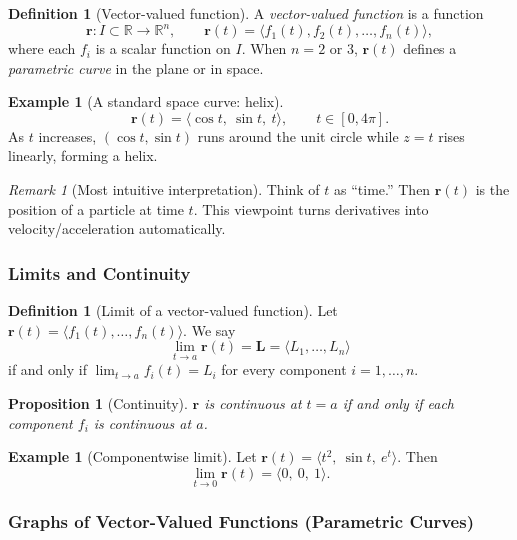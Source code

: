 \documentclass[12pt]{article}
\numberwithin{equation}{section}
\newcommand{\RR}{\mathbb{R}}
\newcommand{\vect}[1]{\boldsymbol{#1}}   %
\theoremstyle{plain}
\newtheorem{proposition}[theorem]{Proposition}
\theoremstyle{definition}
\newtheorem{definition}[theorem]{Definition}
\newtheorem{example}[theorem]{Example}
\theoremstyle{remark}
\newtheorem{remark}[theorem]{Remark}
\begin{document}
\begin{definition}[Vector-valued function]
A \emph{vector-valued function} is a function
\[
\vect r:I\subset\RR \to \RR^n,\qquad
\vect r(t)=\langle f_1(t),f_2(t),\dots,f_n(t)\rangle,
\]
where each $f_i$ is a scalar function on $I$.
When $n=2$ or $3$, $\vect r(t)$ defines a \emph{parametric curve} in the plane or in space.
\end{definition}

\begin{example}[A standard space curve: helix]
\[
\vect r(t)=\langle \cos t,\ \sin t,\ t\rangle,\qquad t\in[0,4\pi].
\]
As $t$ increases, $(\cos t,\sin t)$ runs around the unit circle while $z=t$ rises linearly, forming a helix.
\end{example}

\begin{remark}[Most intuitive interpretation]
Think of $t$ as “time.” Then $\vect r(t)$ is the position of a particle at time $t$. This viewpoint turns derivatives into velocity/acceleration automatically.
\end{remark}

\subsubsection{Limits and Continuity}

\begin{definition}[Limit of a vector-valued function]\label{def:limit-vvf}
Let $\vect r(t)=\langle f_1(t),\dots,f_n(t)\rangle$. We say
\[
\lim_{t\to a}\vect r(t)=\vect L=\langle L_1,\dots,L_n\rangle
\]
if and only if $\lim_{t\to a} f_i(t)=L_i$ for every component $i=1,\dots,n$.
\end{definition}

\begin{proposition}[Continuity]\label{prop:cont-vvf}
$\vect r$ is continuous at $t=a$ if and only if each component $f_i$ is continuous at $a$.
\end{proposition}

\begin{example}[Componentwise limit]
Let $\vect r(t)=\langle t^2,\ \sin t,\ e^t\rangle$. Then
\[
\lim_{t\to 0}\vect r(t)=\langle 0,\ 0,\ 1\rangle.
\]
\end{example}

\subsubsection{Graphs of Vector-Valued Functions (Parametric Curves)}
\end{document}
